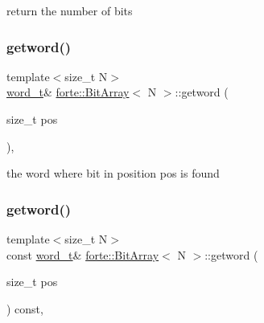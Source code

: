 return the number of bits 

\mbox{\label{classforte_1_1_bit_array_aecfc8a774fcde14d6f458208d658988e}} 
\subsubsection{\texorpdfstring{getword()}{getword()}\hspace{0.1cm}{\footnotesize\ttfamily [1/2]}}
{\footnotesize\ttfamily template$<$size\+\_\+t N$>$ \\
\mbox{\hyperlink{classforte_1_1_bit_array_a7f3b4ebbbe4bc80ce60cc6614cb565da}{word\+\_\+t}}\& \mbox{\hyperlink{classforte_1_1_bit_array}{forte\+::\+Bit\+Array}}$<$ N $>$\+::getword (\begin{DoxyParamCaption}\item[{size\+\_\+t}]{pos }\end{DoxyParamCaption})\hspace{0.3cm}{\ttfamily [inline]}, {\ttfamily [protected]}}



the word where bit in position pos is found 

\mbox{\label{classforte_1_1_bit_array_afd7eda3840661bf37fc587c1374e9bc8}} 
\subsubsection{\texorpdfstring{getword()}{getword()}\hspace{0.1cm}{\footnotesize\ttfamily [2/2]}}
{\footnotesize\ttfamily template$<$size\+\_\+t N$>$ \\
const \mbox{\hyperlink{classforte_1_1_bit_array_a7f3b4ebbbe4bc80ce60cc6614cb565da}{word\+\_\+t}}\& \mbox{\hyperlink{classforte_1_1_bit_array}{forte\+::\+Bit\+Array}}$<$ N $>$\+::getword (\begin{DoxyParamCaption}\item[{size\+\_\+t}]{pos }\end{DoxyParamCaption}) const\hspace{0.3cm}{\ttfamily [inline]}, {\ttfamily [protected]}}



